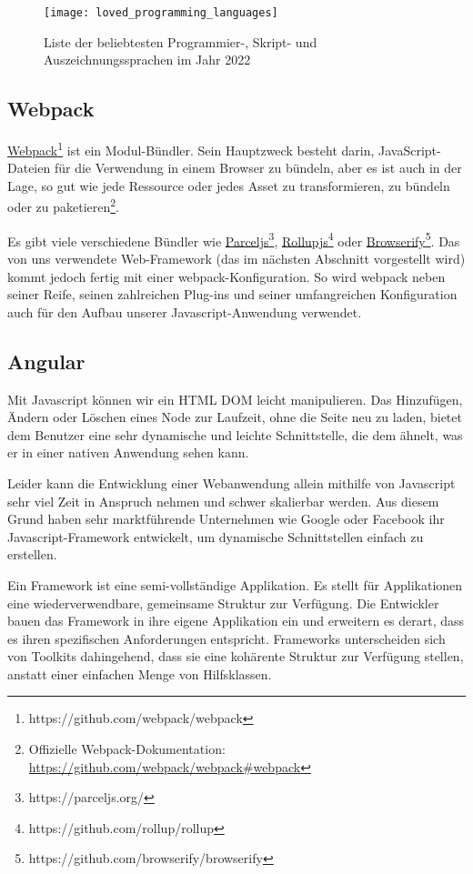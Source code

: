 \begin{figure}[h]
  \centering
  \texttt{[image: loved\_programming\_languages]}
  \caption{Liste der beliebtesten Programmier-, Skript- und Auszeichnungssprachen im Jahr 2022}
  \label{fig:loved_programming_languages}
\end{figure}

\subsection{Webpack}
\href{https://github.com/webpack/webpack}{Webpack}\footnote{https://github.com/webpack/webpack} ist ein Modul-Bündler.
Sein Hauptzweck besteht darin, JavaScript-Dateien für die Verwendung in einem Browser zu bündeln, aber es ist auch in der Lage, so gut wie jede Ressource oder jedes Asset zu transformieren, zu bündeln oder zu {paketieren}\footnote{Offizielle Webpack-Dokumentation: \href{https://github.com/webpack/webpack\#webpack}{https://github.com/webpack/webpack\#webpack}}.

Es gibt viele verschiedene Bündler wie \href{https://parceljs.org/}{Parceljs}\footnote{https://parceljs.org/}, \href{https://github.com/rollup/rollup}{Rollupjs}\footnote{https://github.com/rollup/rollup} oder \href{https://github.com/browserify/browserify}{Browserify}\footnote{https://github.com/browserify/browserify}.
Das von uns verwendete Web-Framework (das im nächsten Abschnitt vorgestellt wird) kommt jedoch fertig mit einer webpack-Konfiguration.
So wird webpack neben seiner Reife, seinen zahlreichen Plug-ins und seiner umfangreichen Konfiguration auch für den Aufbau unserer Javascript-Anwendung verwendet.

\subsection{Angular}
Mit Javascript können wir ein HTML DOM leicht manipulieren. Das Hinzufügen, Ändern oder Löschen eines Node zur Laufzeit, ohne die Seite neu zu laden, bietet dem Benutzer eine sehr dynamische und leichte Schnittstelle, die dem ähnelt, was er in einer nativen Anwendung sehen kann.

Leider kann die Entwicklung einer Webanwendung allein mithilfe von Javascript sehr viel Zeit in Anspruch nehmen und schwer skalierbar werden.
Aus diesem Grund haben sehr marktführende Unternehmen wie Google oder Facebook ihr Javascript-Framework entwickelt, um dynamische Schnittstellen einfach zu erstellen.

Ein Framework ist eine semi-vollständige Applikation. Es stellt für Applikationen eine wiederverwendbare, gemeinsame Struktur zur Verfügung.
Die Entwickler bauen das Framework in ihre eigene Applikation ein und erweitern es derart, dass es ihren spezifischen Anforderungen entspricht.
Frameworks unterscheiden sich von Toolkits dahingehend, dass sie eine kohärente Struktur zur Verfügung stellen, anstatt einer einfachen Menge von Hilfsklassen\cite{DesigningReusableClasses}.

